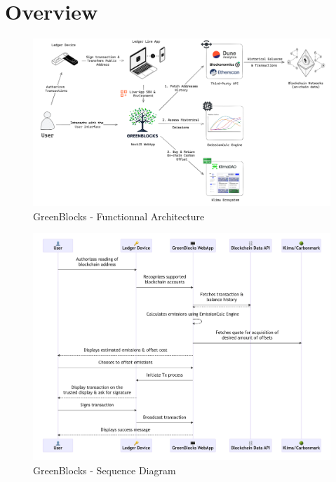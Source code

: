 \documentclass[11pt]{report}
\begin{document}
\section{Overview}
\begin{figure}[h!]
    \centering
    \centerline{\includegraphics[scale=0.08]{figures/functionnal architecture.png}}
    \caption{GreenBlocks - Functionnal Architecture}
    \label{fig:functionnal_architecture}
\end{figure}

\begin{figure}[hbt!]
    \centering
    \centerline{\includegraphics[scale=.27]{figures/sequence.png}}
    \caption{GreenBlocks - Sequence Diagram}
    \label{fig:sequence}
\end{figure}

\end{document}
